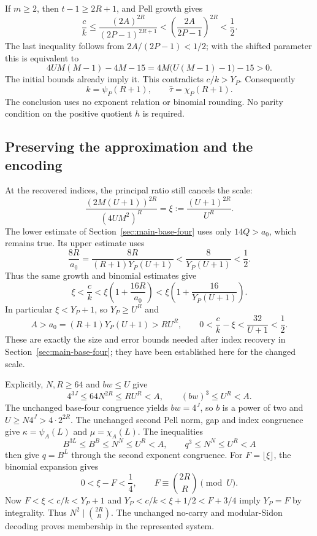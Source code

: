 If $m\ge2$, then $t-1\ge2R+1$, and Pell growth gives
\[
 \frac ck\le\frac{(2A)^{2R}}{(2P-1)^{2R+1}}
 <\left(\frac{2A}{2P-1}\right)^{2R}<\frac12.
\]
The last inequality follows from $2A/(2P-1)<1/2$; with the shifted
parameter this is equivalent to
\[
 4UM(M-1)-4M-15=4M\bigl(U(M-1)-1\bigr)-15>0.
\]
The initial bounds already imply it. This contradicts $c/k>Y_P$.
Consequently
\begin{equation}\label{eq:index-multiple-exact}
 k=\psi_P(R+1),\qquad\widehat\tau=\chi_P(R+1).
\end{equation}
The conclusion uses no exponent relation or binomial rounding.
No parity condition on the positive quotient $h$ is required.

\subsection{Preserving the approximation and the encoding}

At the recovered indices, the principal ratio still cancels the scale:
\[
 \frac{(2M(U+1))^{2R}}{(4UM^2)^R}
 =\xi:=\frac{(U+1)^{2R}}{U^R}.
\]
The lower estimate of Section~\ref{sec:main-base-four} uses only
$14Q>a_0$, which remains true. Its upper estimate uses
\[
 \frac{8R}{a_0}
 =\frac{8R}{(R+1)Y_P(U+1)}
 <\frac8{Y_P(U+1)}<\frac12.
\]
Thus the same growth and binomial estimates give
\begin{equation}\label{eq:index-multiple-ratio}
 \xi<\frac ck
 <\xi\left(1+\frac{16R}{a_0}\right)
 <\xi\left(1+\frac{16}{Y_P(U+1)}\right).
\end{equation}
In particular $\xi<Y_P+1$, so $Y_P\ge U^R$ and
\[
 A>a_0=(R+1)Y_P(U+1)>RU^R,
 \qquad 0<\frac ck-\xi<\frac{32}{U+1}<\frac12.
\]
These are exactly the size and error bounds needed after index
recovery in Section~\ref{sec:main-base-four}; they have been
established here for the changed scale.

Explicitly, $N,R\ge64$ and $bw\le U$ give
\[
 4^{3J}\le64N^{2R}\le RU^R<A,
 \qquad (bw)^3\le U^R<A.
\]
The unchanged base-four congruence yields $bw=4^J$, so $b$ is a
power of two and $U\ge N4^J>4\cdot2^{2R}$.
The unchanged second Pell norm, gap and index congruence give
$\kappa=\psi_A(L)$ and $\mu=\chi_A(L)$.
The inequalities
\[
 B^{3L}\le B^B\le N^N\le U^R<A,
 \qquad q^3\le N^N\le U^R<A
\]
then give $q=B^L$ through the second exponent congruence.
For $F=\lfloor\xi\rfloor$, the binomial expansion gives
\[
 0<\xi-F<\frac14,\qquad
 F\equiv\binom{2R}{R}\pmod U.
\]
Now $F<\xi<c/k<Y_P+1$ and
$Y_P<c/k<\xi+1/2<F+3/4$ imply $Y_P=F$ by integrality.
Thus $N^2\mid\binom{2R}{R}$. The unchanged no-carry and
modular-Sidon decoding proves membership in the represented system.

